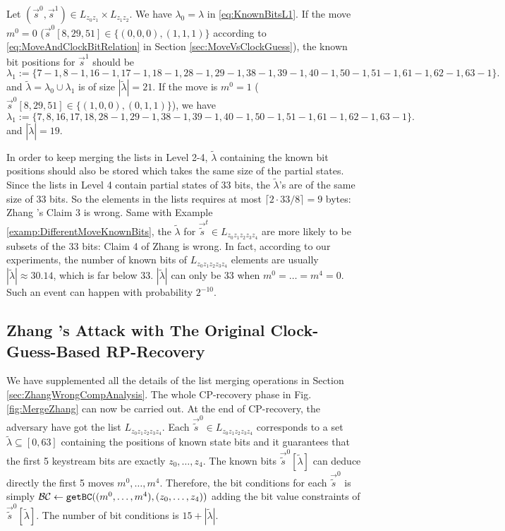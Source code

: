 \begin{example}\label{examp:DifferentMoveKnownBits}
  Let $(\vec{s}^0,\vec{s}^1)\in L_{z_0z_1}\times L_{z_1z_2}$.
  We have $\lambda_0=\lambda$ in \eqref{eq:KnownBitsL1}.
  If the move $m^0=0$ ($\vec{s}^0[8,29,51]\in\{(0,0,0),(1,1,1)\}$ according to \eqref{eq:MoveAndClockBitRelation} in Section \ref{sec:MoveVsClockGuess}), the known bit positions for $\vec{s}^1$ should be
  \[
  \lambda_1:=\{7-1,8-1,16-1,17-1,18-1,   28-1,29-1,38-1,39-1,40-1,  50-1,51-1,61-1,62-1,63-1  \}.
  \]
  and $\tilde{\lambda}=\lambda_0 \cup \lambda_1$ is of size $|\tilde{\lambda}|=21$.
  If the move is $m^0=1$ ($\vec{s}^0[8,29,51]\in  \{(1,0,0),(0,1,1)\}$), we have
  \[
  \lambda_1:=\{7,8,16,17,18,   28-1,29-1,38-1,39-1,40-1,  50-1,51-1,61-1,62-1,63-1  \}.
  \]
  and $|\tilde{\lambda}|=19$.
\end{example}
In order to keep merging the lists in Level 2-4, $\tilde{\lambda}$ containing the known bit positions should also be stored which takes the same size of the partial states.
Since the lists in Level 4 contain partial states of 33 bits, the $\tilde{\lambda}$'s are of the same size of 33 bits.
So the elements in the lists requires at most $\lceil 2\cdot 33/8\rceil=9$ bytes: Zhang \etal's Claim 3 is wrong.
Same with Example \ref{examp:DifferentMoveKnownBits}, the $\tilde{\lambda}$ for $\vec{\tilde{s}}^t\in L_{z_0z_1z_2z_3z_4}$ are more likely to be subsets of the 33 bits: Claim 4 of Zhang \etal is wrong.
In fact, according to our experiments, the number of known bits of $L_{z_0z_1z_2z_3z_4}$ elements are usually $|\tilde{\lambda}|\approx 30.14$, which is far below 33.
$|\tilde{\lambda}|$ can only be 33 when $m^0=\ldots= m^4=0$.
Such an event can happen with probability $2^{-10}$.


\subsection{Zhang \etal's Attack with The Original Clock-Guess-Based RP-Recovery}\label{sec:ZhangRpRecovery}
We have supplemented all the details of the list merging operations in Section \ref{sec:ZhangWrongCompAnalysis}.
The whole CP-recovery phase in Fig. \ref{fig:MergeZhang} can now be carried out.
At the end of CP-recovery, the adversary have got the list $L_{z_0z_1z_2z_3z_4}$.
Each $\vec{\tilde{s}}^0\in L_{z_0z_1z_2z_3z_4}$ corresponds to a set $\tilde{\lambda}\subseteq [0,63]$ containing the positions of known state bits and it guarantees that the first 5 keystream bits are exactly $z_0,\ldots, z_4$.
The known bits $\vec{\tilde{s}}^0[\tilde{\lambda}]$ can deduce directly the first 5 moves $m^0,\ldots, m^4$.
Therefore, the bit conditions for each $\vec{\tilde{s}}^0$ is simply $\mathcal{BC}\leftarrow {\tt getBC}((m^0,\ldots, m^4), (z_0,\ldots, z_4))$ adding the bit value constraints of $\vec{\tilde{s}}^0[\tilde{\lambda}]$.
The number of bit conditions is $15+|\tilde{\lambda}|$.

